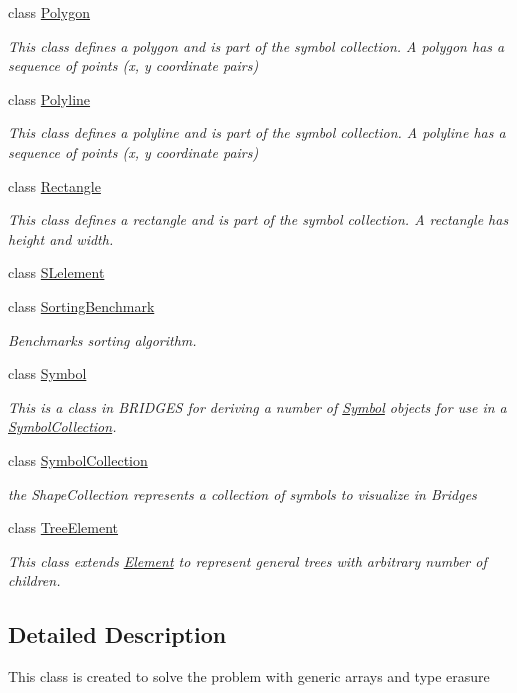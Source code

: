 \begin{DoxyCompactItemize}
class \mbox{\hyperlink{classbridges_1_1base_1_1_polygon}{Polygon}}
\begin{DoxyCompactList}\small\item\em This class defines a polygon and is part of the symbol collection. A polygon has a sequence of points (x, y coordinate pairs) \end{DoxyCompactList}\item 
class \mbox{\hyperlink{classbridges_1_1base_1_1_polyline}{Polyline}}
\begin{DoxyCompactList}\small\item\em This class defines a polyline and is part of the symbol collection. A polyline has a sequence of points (x, y coordinate pairs) \end{DoxyCompactList}\item 
class \mbox{\hyperlink{classbridges_1_1base_1_1_rectangle}{Rectangle}}
\begin{DoxyCompactList}\small\item\em This class defines a rectangle and is part of the symbol collection. A rectangle has height and width. \end{DoxyCompactList}\item 
class \mbox{\hyperlink{classbridges_1_1base_1_1_s_lelement}{S\+Lelement}}
\item 
class \mbox{\hyperlink{classbridges_1_1base_1_1_sorting_benchmark}{Sorting\+Benchmark}}
\begin{DoxyCompactList}\small\item\em Benchmarks sorting algorithm. \end{DoxyCompactList}\item 
class \mbox{\hyperlink{classbridges_1_1base_1_1_symbol}{Symbol}}
\begin{DoxyCompactList}\small\item\em This is a class in B\+R\+I\+D\+G\+ES for deriving a number of \mbox{\hyperlink{classbridges_1_1base_1_1_symbol}{Symbol}} objects for use in a \mbox{\hyperlink{classbridges_1_1base_1_1_symbol_collection}{Symbol\+Collection}}. \end{DoxyCompactList}\item 
class \mbox{\hyperlink{classbridges_1_1base_1_1_symbol_collection}{Symbol\+Collection}}
\begin{DoxyCompactList}\small\item\em the Shape\+Collection represents a collection of symbols to visualize in Bridges \end{DoxyCompactList}\item 
class \mbox{\hyperlink{classbridges_1_1base_1_1_tree_element}{Tree\+Element}}
\begin{DoxyCompactList}\small\item\em This class extends \mbox{\hyperlink{classbridges_1_1base_1_1_element}{Element}} to represent general trees with arbitrary number of children. \end{DoxyCompactList}\end{DoxyCompactItemize}


\subsection{Detailed Description}
This class is created to solve the problem with generic arrays and type erasure 
